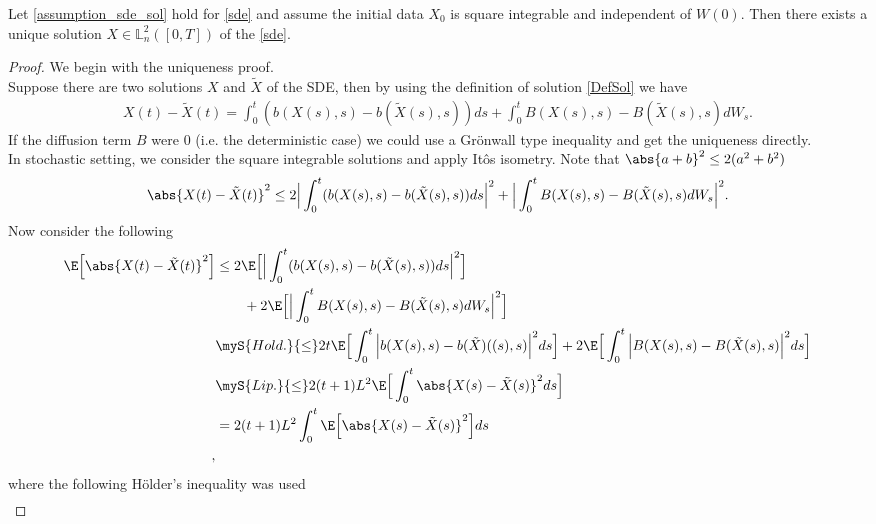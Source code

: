 \begin{theorem}\label{sde_solution_theorem}
  Let \autoref{assumption_sde_sol} hold for \autoref{sde} and assume the initial data $X_0$ is  
  square integrable and independent of $W(0)$.
  Then there exists a unique solution $X \in  \mathbb{L}^2_n([0,T])$ of the \autoref{sde}.
\end{theorem}
\begin{proof}
  We begin with the uniqueness proof.\\[1ex] 
  Suppose there are two solutions $X$ and $\tilde{X} $ of the SDE,
  then by using the definition of solution \autoref{DefSol} we have
  \begin{align*}
    X(t) - \tilde{X}(t) = \int_0^{t} (b(X(s),s) - b(\tilde{X}(s),s )) ds + \int_0^{t} B(X(s),s) - B(\tilde{X}(s),s )  dW_s
  .\end{align*}
  If the diffusion term $B$ were 0 (i.e. the deterministic case) we could use a Grönwall type inequality and get the uniqueness directly.\\[1ex]
  In stochastic setting, we consider the square integrable solutions and apply It\^os isometry. Note that
$\abs{a+b}^2 \le  2(a^2+b^2)$
  \begin{align*}
    \abs{X(t) - \tilde{X}(t)}^2 \le  2\Big|\int_0^{t} (b(X(s),s) - b(\tilde{X}(s),s )) ds\Big|^2 + \Big|\int_0^{t} B(X(s),s) - B(\tilde{X}(s),s )  dW_s\Big|^2
  .\end{align*}
  Now consider the following 
  \begin{align*}
    \E\Big[\abs{X(t)-\tilde{X}(t)}^2\Big] &\le 2\E\Big[\Big|\int_0^{t} (b(X(s),s) - b(\tilde{X}(s),s )) ds\Big|^2 \Big]  \\
                                & \qquad + 2 \E\Big[\Big|\int_0^{t} B(X(s),s) - B(\tilde{X}(s),s ) dW_s\Big|^2\Big]\\
                                &\myS{Hold.}{\le } 2t \E\Big[\int_0^{t} \Big|b(X(s),s) - b(\tilde{X})((s),s )\Big|^2 ds \Big] + 2\E\Big[\int_0^{t} \Big|B(X(s),s)-B(\tilde{X}(s),s )\Big|^2 ds \Big] \\
                                &\myS{Lip.}{\le } 2(t+1)L^2 \E\Big[\int_0^{t} \abs{X(s)-\tilde{X}(s) }^2 ds \Big]\\
                                &= 2(t+1)L^2 \int_0^{t} \E\Big[\abs{X(s)-\tilde{X}(s) }^2  \Big]ds\\
  ,\end{align*}
where the following H\"older's inequality was used 
 \begin{align*}

\end{align*}
\end{proof}
